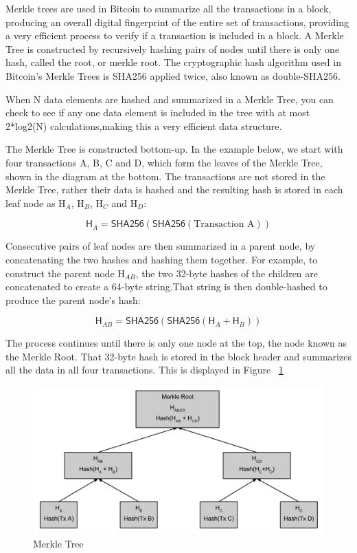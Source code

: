 Merkle trees are used in Bitcoin to summarize all the transactions in a block,
producing an overall digital fingerprint of the entire set of transactions,
providing a very efficient process to verify if a transaction is included in a
block. A Merkle Tree is constructed by recursively hashing pairs of nodes until
there is only one hash, called the root, or merkle root. The cryptographic hash
algorithm used in Bitcoin’s Merkle Trees is SHA256 applied twice, also known as
double-SHA256.

When N data elements are hashed and summarized in a Merkle Tree, you can check
to see if any one data element is included in the tree with at most 2*log2(N)
calculations,making this a very efficient data structure.

The Merkle Tree is constructed bottom-up. In the example below, we
start with four transactions A, B, C and D, which form the leaves
of the Merkle Tree, shown in the diagram at the bottom. The transactions
are not stored in the Merkle Tree, rather their data is hashed and the
resulting hash is stored in each leaf node as \textsf{H$_A$}, \textsf{H$_B$},
\textsf{H$_C$} and \textsf{H$_D$}:

\[\textsf{H$_A$} = \textsf{SHA256}(\textsf{SHA256}(\textrm{Transaction A})) \]

Consecutive pairs of leaf nodes are then summarized in a parent node, by
concatenating the two hashes and hashing them together. For example, to
construct the parent node \textsf{H$_{AB}$}, the two 32-byte hashes of the
children are concatenated to create a 64-byte string.That string is then
double-hashed to produce the parent node’s hash:

\[ \textsf{H$_{AB}$} = \textsf{SHA256}(\textsf{SHA256}(\textsf{H$_A$} +
\textsf{H$_B$}))\]

The process continues until there is only one node at the top, the node known
as the Merkle Root. That 32-byte hash is stored in the block header and
summarizes all the data in all four transactions. This is displayed in Figure
~\ref{fig:merkle-tree}

\begin{figure}[H]
  \begin{center}
    \includegraphics[width=0.6\columnwidth]{images/merkle.png}
  \end{center}
  \caption{Merkle Tree}
  \label{fig:merkle-tree}
\end{figure}

